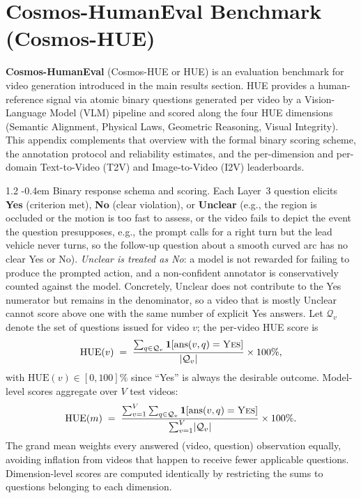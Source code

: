 \documentclass{llmxive}
\makeatletter
\providecommand{\paragraph}{  \@startsection{paragraph}{4}{\z@}    {1\baselineskip \@plus .2\baselineskip}    {-0.4em}    {\normalfont\normalsize\bfseries}}
\makeatother
\begin{document}
\FloatBarrier

\section{Cosmos-HumanEval Benchmark (Cosmos-HUE)}
\label{sec::cosmos_hue_bench}

\textbf{Cosmos-HumanEval} (Cosmos-HUE or HUE) is an evaluation benchmark for video generation introduced in the main results section. HUE provides a human-reference signal via atomic binary questions generated per video by a Vision-Language Model (VLM) pipeline and scored along the four HUE dimensions (Semantic Alignment, Physical Laws, Geometric Reasoning, Visual Integrity). This appendix complements that overview with the formal binary scoring scheme, the annotation protocol and reliability estimates, and the per-dimension and per-domain Text-to-Video (T2V) and Image-to-Video (I2V) leaderboards.

\paragraph{Binary response schema and scoring.} Each Layer~3 question elicits \textbf{Yes} (criterion met), \textbf{No} (clear violation), or \textbf{Unclear} (e.g., the region is
occluded or the motion is too fast to assess, or the video fails to depict the event the question presupposes, e.g., the prompt calls for a right turn but the lead vehicle never
turns, so the follow-up question about a smooth curved arc has no clear Yes or No). \emph{Unclear is treated as No}: a model is not rewarded for failing to produce the prompted action,
and a non-confident annotator is conservatively counted against the model. Concretely, Unclear does not contribute to the Yes numerator but remains in the denominator, so a video that
is mostly Unclear cannot score above one with the same number of explicit Yes answers. Let $\mathcal{Q}_v$ denote the set of questions issued for video $v$; the per-video
HUE score is
\begin{equation}
  \mathrm{HUE}(v) \;=\; \frac{\sum_{q \in \mathcal{Q}_v} \mathbf{1}\!\left[\mathrm{ans}(v,q) = \textsc{Yes}\right]}{\lvert \mathcal{Q}_v \rvert} \times 100\%,
  \label{eq:hue_video}
\end{equation}
with $\mathrm{HUE}(v) \in [0, 100]\%$ since ``Yes'' is always the desirable outcome. Model-level scores aggregate over $V$ test videos:
\begin{equation}
  \mathrm{HUE}(m) \;=\; \frac{\sum_{v=1}^{V} \sum_{q \in \mathcal{Q}_v} \mathbf{1}\!\left[\mathrm{ans}(v,q) = \textsc{Yes}\right]}{\sum_{v=1}^{V} \lvert \mathcal{Q}_v \rvert} \times
100\%.
  \label{eq:hue_model}
\end{equation}
The grand mean weights every answered (video, question) observation equally, avoiding inflation from videos that happen to receive fewer applicable questions. Dimension-level scores
are computed identically by restricting the sums to questions belonging to each dimension.
\end{document}
